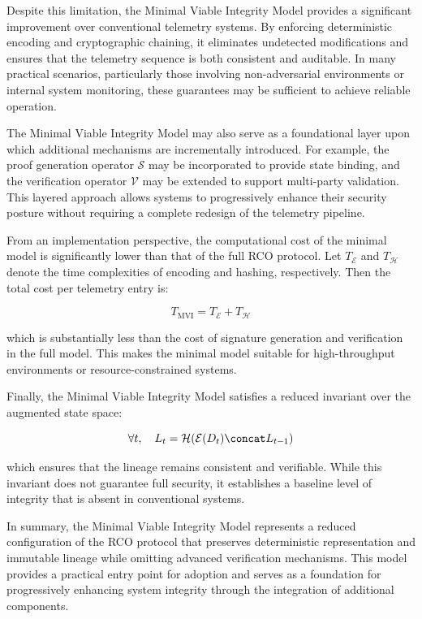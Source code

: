 Despite this limitation, the Minimal Viable Integrity Model provides a significant improvement over conventional telemetry systems. By enforcing deterministic encoding and cryptographic chaining, it eliminates undetected modifications and ensures that the telemetry sequence is both consistent and auditable. In many practical scenarios, particularly those involving non-adversarial environments or internal system monitoring, these guarantees may be sufficient to achieve reliable operation.

The Minimal Viable Integrity Model may also serve as a foundational layer upon which additional mechanisms are incrementally introduced. For example, the proof generation operator $\mathcal{S}$ may be incorporated to provide state binding, and the verification operator $\mathcal{V}$ may be extended to support multi-party validation. This layered approach allows systems to progressively enhance their security posture without requiring a complete redesign of the telemetry pipeline.

From an implementation perspective, the computational cost of the minimal model is significantly lower than that of the full RCO protocol. Let $T_{\mathcal{E}}$ and $T_{\mathcal{H}}$ denote the time complexities of encoding and hashing, respectively. Then the total cost per telemetry entry is:

\begin{equation}
T_{\text{MVI}} = T_{\mathcal{E}} + T_{\mathcal{H}}
\end{equation}

which is substantially less than the cost of signature generation and verification in the full model. This makes the minimal model suitable for high-throughput environments or resource-constrained systems.

Finally, the Minimal Viable Integrity Model satisfies a reduced invariant over the augmented state space:

\begin{equation}
\forall t, \quad L_t = \mathcal{H}(\mathcal{E}(D_t) \concat L_{t-1})
\end{equation}

which ensures that the lineage remains consistent and verifiable. While this invariant does not guarantee full security, it establishes a baseline level of integrity that is absent in conventional systems.

In summary, the Minimal Viable Integrity Model represents a reduced configuration of the RCO protocol that preserves deterministic representation and immutable lineage while omitting advanced verification mechanisms. This model provides a practical entry point for adoption and serves as a foundation for progressively enhancing system integrity through the integration of additional components.

